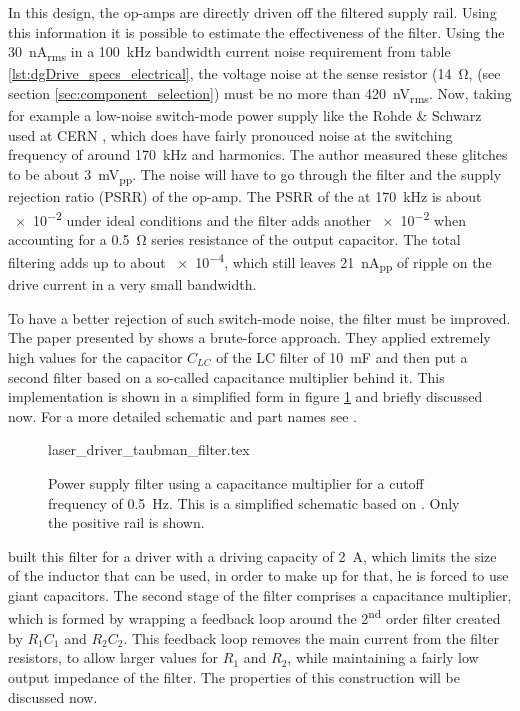 In this design, the op-amps are directly driven off the filtered supply rail. Using this information it is possible to estimate the effectiveness of the filter. Using the \qty{30}{\nA_{rms}} in a \qty{100}{\kHz} bandwidth current noise requirement from table \ref{lst:dgDrive_specs_electrical}, the voltage noise at the sense resistor (\qty{14}{\ohm}, (see section \ref{sec:component_selection}) must be no more than \qty{420}{\nV_{rms}}. Now, taking for example a low-noise switch-mode power supply like the Rohde \& Schwarz  used at CERN \cite{hmp4040_noise}, which does have fairly pronouced noise at the switching frequency of around \qty{170}{\kHz} and harmonics. The author measured these glitches to be about \qty{3}{\mV_{pp}}. The noise will have to go through the filter and the supply rejection ratio (PSRR) of the op-amp. The PSRR of the  at \qty{170}{\kHz} is about \num{e-2} under ideal conditions \cite{datasheet_LT1028} and the filter adds another \num{e-2} when accounting for a \qty{0.5}{\ohm} series resistance of the output capacitor. The total filtering adds up to about \num{e-4}, which still leaves \qty{21}{\nA_{pp}} of ripple on the drive current in a very small bandwidth.

To have a better rejection of such switch-mode noise, the filter must be improved. The paper presented by \citeauthor{laser_driver_qcl_taubman} \cite{laser_driver_qcl_taubman} shows a brute-force approach. They applied extremely high values for the capacitor $C_{LC}$ of the LC filter of \qty{10}{\milli\farad} and then put a second filter based on a so-called capacitance multiplier behind it. This implementation is shown in a simplified form in figure \ref{fig:laser_driver_taubman_filter} and briefly discussed now. For a more detailed schematic and part names see \cite{laser_driver_qcl_taubman}.

\begin{figure}[ht]
    \centering
        {laser_driver_taubman_filter.tex}
    \caption{Power supply filter using a capacitance multiplier for a cutoff frequency of \qty{0.5}{\Hz}. This is a simplified schematic based on \cite{laser_driver_qcl_taubman}. Only the positive rail is shown.}
    \label{fig:laser_driver_taubman_filter}
\end{figure}

\citeauthor{laser_driver_qcl_taubman} built this filter for a driver with a driving capacity of \qty{2}{\A}, which limits the size of the inductor that can be used, in order to make up for that, he is forced to use giant capacitors. The second stage of the filter comprises a capacitance multiplier, which is formed by wrapping a feedback loop around the 2\textsuperscript{nd} order filter created by $R_1 C_1$ and $R_2 C_2$. This feedback loop removes the main current from the filter resistors, to allow larger values for $R_1$ and $R_2$, while maintaining a fairly low output impedance of the filter. The properties of this construction will be discussed now.


